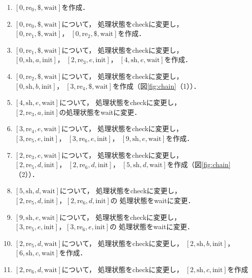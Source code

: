 \documentclass[japanese]{jnlp_1.4}
\begin{document}
\begin{enumerate}
\item $[0,\mathrm{re}_0,\$,\mbox{wait}]$を作成．
\item $[0,\mathrm{re}_0,\$,\mbox{wait}]$について，
  処理状態をcheckに変更し，\\
  $[0,\mathrm{re}_1,\$,\mbox{wait}]$，
  $[0,\mathrm{re}_2,\$,\mbox{wait}]$を作成．
\item $[0,\mathrm{re}_1,\$,\mbox{wait}]$について，
  処理状態をcheckに変更し，\\
  $[0,\mathrm{sh},a,\mbox{init}]$，
  $[2,\mathrm{re}_3,e,\mbox{init}]$，
  $[4,\mathrm{sh},e,\mbox{wait}]$を作成．
\item $[0,\mathrm{re}_2,\$,\mbox{wait}]$について，
  処理状態をcheckに変更し，\\
  $[0,\mathrm{sh},b,\mbox{init}]$，
  $[3,\mathrm{re}_4,\$,\mbox{wait}]$を作成（図\ref{fig:chain}（1））．
\item $[4,\mathrm{sh},e,\mbox{wait}]$について，
  処理状態をcheckに変更し，\\
  $[2,\mathrm{re}_3,a,\mbox{init}]$の処理状態をwaitに変更．
\item $[3,\mathrm{re}_4,e,\mbox{wait}]$について，
  処理状態をcheckに変更し，\\
  $[3,\mathrm{re}_5,e,\mbox{init}]$，
  $[3,\mathrm{re}_6,e,\mbox{init}]$，
  $[9,\mathrm{sh},e,\mbox{wait}]$を作成．
\item $[2,\mathrm{re}_3,e,\mbox{wait}]$について，
  処理状態をcheckに変更し，\\
  $[2,\mathrm{re}_5,d,\mbox{init}]$，
  $[2,\mathrm{re}_6,d,\mbox{init}]$，
  $[5,\mathrm{sh},d,\mbox{wait}]$を作成（図\ref{fig:chain}（2））．
\item $[5,\mathrm{sh},d,\mbox{wait}]$について，
  処理状態をcheckに変更し，\\
  $[2,\mathrm{re}_5,d,\mbox{init}]$，$[2,\mathrm{re}_6,d,\mbox{init}]$の
  処理状態をwaitに変更．
\item $[9,\mathrm{sh},e,\mbox{wait}]$について，
  処理状態をcheckに変更し，\\
  $[3,\mathrm{re}_5,e,\mbox{init}]$，$[3,\mathrm{re}_6,e,\mbox{init}]$の
  処理状態をwaitに変更．
\item $[2,\mathrm{re}_5,d,\mbox{wait}]$について，
  処理状態をcheckに変更し，
  $[2,\mathrm{sh},b,\mbox{init}]$，
  $[6,\mathrm{sh},c,\mbox{wait}]$を作成．
\item $[2,\mathrm{re}_6,d,\mbox{wait}]$について，
  処理状態をcheckに変更し，
  $[2,\mathrm{sh},c,\mbox{init}]$を作成\\

\end{enumerate}
\end{document}
